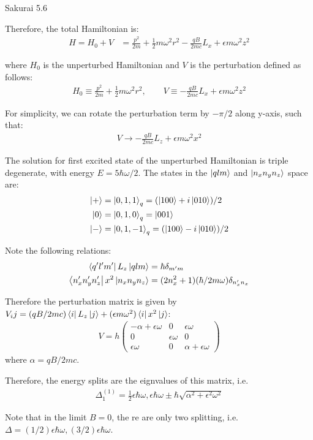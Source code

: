 \documentclass{article}
\begin{document}
\begin{section}{Sakurai 5.6}
\begin{tcolorbox}[breakable]
		Therefore, the total Hamiltonian is: 
		\begin{align*}
			H = H_0 + V &= \frac{p^2}{2m} + \frac{1}{2} m\omega^2r^2 - \frac{qB}{2mc}L_x + \epsilon m \omega^2 z^2 
		\end{align*}

		where $H_0$ is the unperturbed Hamiltonian and $V$ is the perturbation defined as follows:
		\begin{align*}
			H_0 \equiv \frac{p^2}{2m} + \frac{1}{2} m\omega^2r^2, \qquad 
			V \equiv - \frac{qB}{2mc}L_x + \epsilon m \omega^2 z^2
		\end{align*}

		For simplicity, we can rotate the perturbation term by $-\pi/2$ along y-axis, such that:
		\begin{align*}
			V \rightarrow - \frac{qB}{2mc}L_z + \epsilon m \omega^2 x^2
		\end{align*}

		The solution for first excited state of the unperturbed Hamiltonian is triple degenerate, with energy $E = 5 \hbar\omega/2$. The states in the $\ket{qlm}$ and $\ket{n_xn_yn_z}$ space are:
		\begin{align*}
			\ket{+} &= \ket{0,1,1}_q = (\ket{100} + i \ket{010})/2 \\ 
			\ket{0} &= \ket{0,1,0}_q = \ket{001} \\
			\ket{-} &= \ket{0,1,-1}_q = (\ket{100} - i \ket{010})/2 \\ 
		\end{align*}

		Note the following relations: 
		\begin{align*}
			\bra{q'l'm'}L_z\ket{qlm} &= \hbar \delta_{m'm} \\
			\bra{n_x'n_y'n_z'}x^2\ket{n_xn_yn_z} &= (2n_x^2+1)(\hbar/2m\omega) \delta_{n_x'n_x}
		\end{align*}

		Therefore the perturbation matrix is given by $V_ij = (qB/2mc)\bra{i}L_z\ket{j} + (\epsilon m \omega^2) \bra{i}x^2\ket{j}$:
		\begin{align*}
			V = h \begin{pmatrix}
				-\alpha + \epsilon \omega & 0 & \epsilon \omega \\
				0 & \epsilon \omega & 0 \\
				\epsilon \omega & 0 & \alpha + \epsilon \omega
			\end{pmatrix}
		\end{align*}
		where $\alpha = qB/2mc$.

		Therefore, the energy splits are the eignvalues of this matrix, i.e.
		\begin{align*}
			\Delta_1^(1) = \frac{1}{2}\epsilon\hbar\omega, \epsilon\hbar\omega \pm \hbar \sqrt{ \alpha^2 + \epsilon^2 \omega^2}
		\end{align*}

		Note that in the limit $B = 0$, the re are only two splitting, i.e. $\Delta = (1/2)\epsilon\hbar\omega, (3/2)\epsilon\hbar\omega$. 
    \end{tcolorbox}
	\end{section}
\end{document}
